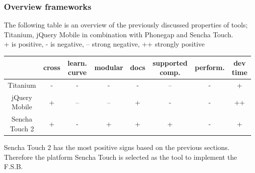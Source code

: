 \subsubsection{Overview frameworks}
The following table is an overview of the previously discussed properties of tools; Titanium, jQuery Mobile in combination with Phonegap and Sencha Touch. \\

+ is positive, - is negative, -- strong negative, ++ strongly positive \\
\begin{tabular}{|c|c|c|c|c|c|c|c|}
\hline 
   & cross & learn. curve & modular & docs & supported comp. & perform. & dev time \\ 
\hline 
Titanium & - & - & - & - & -- & - & + \\ 
\hline 
jQuery Mobile & + & -- & -- & + & - & - & ++ \\
\hline 
Sencha Touch 2 & + & - & + & + & + & - & + \\ 
\hline 

\end{tabular} 

Sencha Touch 2 has the most positive signs based on the previous sections. Therefore the platform Sencha Touch is selected as the tool to implement the F.S.B.


